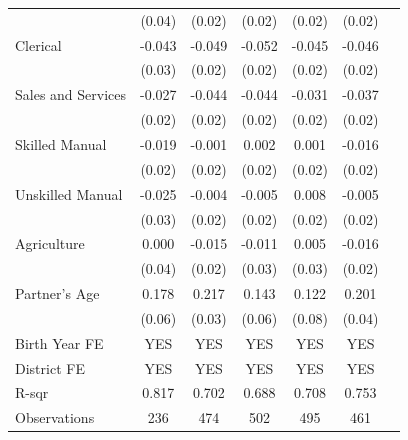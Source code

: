 \begin{longtable}{l*{6}{c}}
                    & (0.04) & (0.02) & (0.02) & (0.02) & (0.02) \\
\hspace{1em}Clerical & -0.043 & -0.049\sym{**} & -0.052\sym{**} & -0.045\sym{*} & -0.046\sym{*} \\
                    & (0.03) & (0.02) & (0.02) & (0.02) & (0.02) \\
\hspace{1em}Sales and Services & -0.027 & -0.044\sym{**} & -0.044\sym{**} & -0.031\sym{*} & -0.037\sym{**} \\
                    & (0.02) & (0.02) & (0.02) & (0.02) & (0.02) \\
\hspace{1em}Skilled Manual & -0.019 & -0.001 & 0.002 & 0.001 & -0.016 \\
                    & (0.02) & (0.02) & (0.02) & (0.02) & (0.02) \\
\hspace{1em}Unskilled Manual & -0.025 & -0.004 & -0.005 & 0.008 & -0.005 \\
                    & (0.03) & (0.02) & (0.02) & (0.02) & (0.02) \\
\hspace{1em}Agriculture & 0.000 & -0.015 & -0.011 & 0.005 & -0.016 \\
                    & (0.04) & (0.02) & (0.03) & (0.03) & (0.02) \\
Partner's Age & 0.178\sym{***} & 0.217\sym{***} & 0.143\sym{**} & 0.122 & 0.201\sym{***} \\
                    & (0.06) & (0.03) & (0.06) & (0.08) & (0.04) \\
\hline
Birth Year FE & YES & YES & YES & YES & YES \\
District FE & YES & YES & YES & YES & YES \\
R-sqr & 0.817 & 0.702 & 0.688 & 0.708 & 0.753 \\
Observations & 236 & 474 & 502 & 495 & 461 \\
\hline \hline

\end{longtable}
